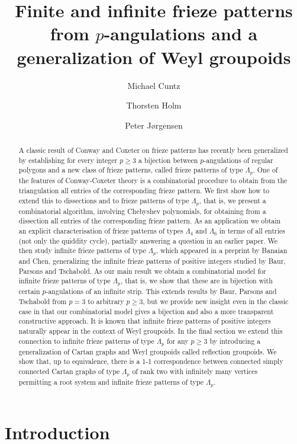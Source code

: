 \documentclass[11pt,a4paper]{amsart}
\title[Finite and infinite frieze patterns from $p$-angulations]
{Finite and infinite frieze patterns from $p$-angulations and a generalization of Weyl
groupoids}
\author{Michael Cuntz}
\author{Thorsten Holm}
\author{Peter J{\o}rgensen}
\theoremstyle{definition}
\numberwithin{equation}{section}
\begin{document}
\begin{abstract}
A classic result of Conway and Coxeter on frieze patterns has recently been generalized 
by establishing for every integer $p\ge 3$ 
a bijection between $p$-angulations of regular polygons and a new class of frieze patterns, called frieze
patterns of type $\Lambda_p$.   
One of the features of Conway-Coxeter theory is a combinatorial procedure to obtain from the 
triangulation all entries of the corresponding frieze pattern. We first show how to extend this to dissections 
and to frieze patterns of type $\Lambda_p$, that is, we present a combinatorial algorithm, involving
Chebyshev polynomials, for obtaining
from a dissection all entries of the corresponding frieze pattern.  
As an application we obtain an explicit characterisation of frieze patterns of types $\Lambda_4$ and
$\Lambda_6$ in terms of all entries (not only the quiddity cycle), partially answering a question 
in an earlier paper. 
We then study infinite frieze patterns of type $\Lambda_p$, which appeared in a preprint by Banaian and Chen, 
generalizing the infinite frieze patterns 
of positive integers studied by Baur, Parsons and Tschabold. As our main result we obtain a 
combinatorial model for infinite frieze patterns of type $\Lambda_p$, that is, we show that these are 
in bijection with certain $p$-angulations of an infinite strip. This extends results by 
Baur, Parsons and Tschabold from $p=3$ to arbitrary $p\ge 3$, but we provide new insight even in the classic 
case in that our combinatorial model gives a bijection and also a more transparent constructive approach.
It is known that infinite frieze patterns 
of positive integers naturally appear in the
context of Weyl groupoids. In the final section 
we extend this connection to infinite frieze 
patterns of type $\Lambda_p$ for any $p\ge 3$ 
by introducing a generalization of Cartan 
graphs and Weyl 
groupoids called reflection groupoids. 
We show that, up to equivalence, there is a 1-1 correspondence 
between connected simply connected Cartan graphs of 
type $\Lambda_p$ of rank two with infinitely many vertices permitting a root system and 
infinite frieze patterns of type $\Lambda_p$.
\end{abstract}


\maketitle


\section{Introduction}
\end{document}
